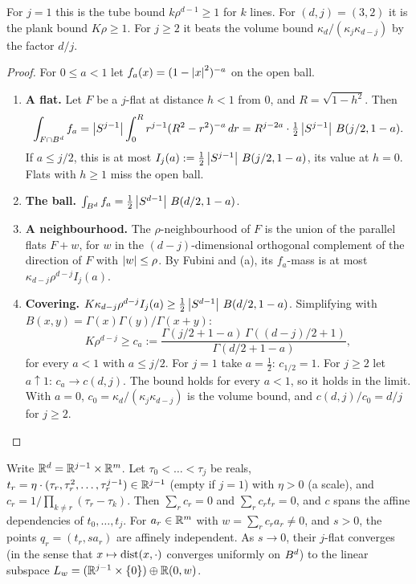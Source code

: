 For $j=1$ this is the tube bound $k\rho^{d-1}\ge1$ for $k$ lines. For $(d,j)=(3,2)$ it is the plank bound $K\rho\ge1$. For
$j\ge2$ it beats the volume bound $\kappa_d/(\kappa_j\kappa_{d-j})$ by the factor $d/j$.

\begin{proof}
For $0\le a<1$ let $f_a(x)=(1-\left|x\right|^2)^{-a}$ on the open ball.
\begin{enumerate}[label=(\alph*)]
  \item \textbf{A flat.} Let $F$ be a $j$-flat at distance $h<1$ from $0$, and $R=\sqrt{1-h^2}$.
    Then
    \[
      \int_{F\cap B^d}f_a=\left|S^{j-1}\right|\int_0^Rr^{j-1}(R^2-r^2)^{-a}\,dr
      =R^{j-2a}\cdot\tfrac12\left|S^{j-1}\right|\,B(j/2,1-a).
    \]
    If $a\le j/2$, this is at most $I_j(a):=\frac12\left|S^{j-1}\right|\,B(j/2,1-a)$, its value at
    $h=0$. Flats with $h\ge1$ miss the open ball.
  \item \textbf{The ball.} $\int_{B^d}f_a=\frac12\left|S^{d-1}\right|\,B(d/2,1-a)$.
  \item \textbf{A neighbourhood.} The $\rho$-neighbourhood of $F$ is the union of the parallel flats
    $F+w$, for $w$ in the $(d-j)$-dimensional orthogonal complement of the direction of $F$ with
    $\left|w\right|\le\rho$. By Fubini and (a), its $f_a$-mass is at most $\kappa_{d-j}\rho^{d-j}I_j(a)$.
  \item \textbf{Covering.} $K\kappa_{d-j}\rho^{d-j}I_j(a)\ge\frac12\left|S^{d-1}\right|\,B(d/2,1-a)$.
    Simplifying with $B(x,y)=\Gamma(x)\Gamma(y)/\allowbreak\Gamma(x+y)$:
    \begin{equation*}
      K\rho^{d-j}\ge c_a:=\frac{\Gamma(j/2+1-a)\,\Gamma((d-j)/2+1)}{\Gamma(d/2+1-a)},
    \end{equation*}
    for every $a<1$ with $a\le j/2$.
    For $j=1$ take $a=\frac12$: $c_{1/2}=1$. For $j\ge2$ let $a\uparrow1$: $c_a\to c(d,j)$. The bound
    holds for every $a<1$, so it holds in the limit. With $a=0$,
    $c_0=\kappa_d/(\kappa_j\kappa_{d-j})$ is the volume bound, and $c(d,j)/c_0=d/j$ for
    $j\ge2$.\qedhere
\end{enumerate}
\end{proof}

\begin{lemma}\label{D:M2}
Write $\mathbb{R}^d=\mathbb{R}^{j-1}\times\mathbb{R}^m$. Let $\tau_0<\dots<\tau_j$ be reals,
$t_r=\eta\cdot(\tau_r,\tau_r^2,\dots,\tau_r^{j-1})\in\mathbb{R}^{j-1}$ (empty if $j=1$) with $\eta>0$ (a
scale),
and $c_r=1/\prod_{k\ne r}(\tau_r-\tau_k)$. Then $\sum_rc_r=0$ and $\sum_rc_rt_r=0$, and $c$ spans
the affine dependencies of $t_0,\dots,t_j$. For $a_r\in\mathbb{R}^m$ with $w=\sum_rc_ra_r\ne0$, and $s>0$,
the points $q_r=(t_r,sa_r)$ are affinely independent. As $s\to0$, their $j$-flat converges (in the
sense that $x\mapsto\operatorname{dist}(x,\cdot)$ converges uniformly on $B^d$) to the linear subspace
$L_w=(\mathbb{R}^{j-1}\times\{0\})\oplus\mathbb{R}(0,w)$.
\end{lemma}

